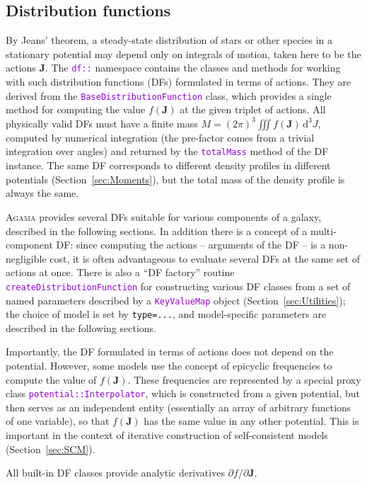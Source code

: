 \documentclass[12pt]{article}
\newcommand{\Agama}{\textsc{Agama}\xspace}
\newcommand{\ttt}[1]{\textcolor{darkviolet}{\texttt{#1}}}
\newcommand{\ppp}[1]{\textcolor{darkolive} {\texttt{#1}}}
\renewcommand{\d}{\mathrm{d}}
\newcommand{\bJ}{\boldsymbol{J}}
\begin{document}
\subsection{Distribution functions}  \label{sec:DF}

By Jeans' theorem, a steady-state distribution of stars or other species in a stationary potential may depend only on integrals of motion, taken here to be the actions $\bJ$. The \ttt{df::} namespace contains the classes and methods for working with such distribution functions (DFs) formulated in terms of actions. They are derived from the \ttt{BaseDistributionFunction} class, which provides a single method for computing the value $f(\bJ)$ at the given triplet of actions. All physically valid DFs must have a finite mass $M = (2\pi)^3 \iiint f(\bJ)\,\d ^3J$, computed by numerical integration (the pre-factor comes from a trivial integration over angles) and returned by the \ttt{totalMass} method of the DF instance.
The same DF corresponds to different density profiles in different potentials (Section~\ref{sec:Moments}), but the total mass of the density profile is always the same.

\Agama provides several DFs suitable for various components of a galaxy, described in the following sections. In addition there is a concept of a multi-component DF: since computing the actions -- arguments of the DF -- is a non-negligible cost, it is often advantageous to evaluate several DFs at the same set of actions at once.
There is also a ``DF factory'' routine \ttt{createDistributionFunction} for constructing various DF classes from a set of named parameters described by a \ttt{KeyValueMap} object (Section~\ref{sec:Utilities}); the choice of model is set by \ppp{type=...}, and model-specific parameters are described in the following sections.

Importantly, the DF formulated in terms of actions does not depend on the potential. However, some models use the concept of epicyclic frequencies to compute the value of $f(\bJ)$. These frequencies are represented by a special proxy class \ttt{potential::Interpolator}, which is constructed from a given potential, but then serves as an independent entity (essentially an array of arbitrary functions of one variable), so that $f(\bJ)$ has the same value in any other potential. This is important in the context of iterative construction of self-consistent models (Section~\ref{sec:SCM}).

All built-in DF classes provide analytic derivatives $\partial f/\partial \bJ$.
\end{document}
